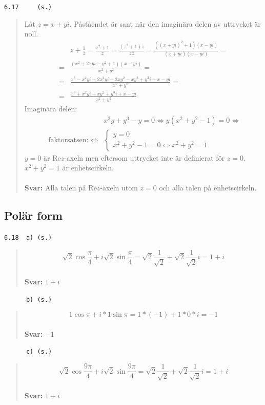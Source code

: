 \documentclass[a4paper]{article}
\newcommand{\tskcol}[1]{\textcolor{tskcol}{#1}}
\begin{document}
	\texttt{\tskcol{6.17~~~~ (s.)}}
	\begin{quotation}
		\noindent
		Låt $z=x+yi$. Påståendet är sant när den imaginära delen av uttrycket är noll.
		\begin{align*}
		&z+\frac{1}{z}=
		\frac{z^2+1}{z}=
		\frac{(z^2+1)\overline{z}}{z\overline{z}}=
		\frac{((x+yi)^2+1)(x-yi)}{(x+yi)(x-yi)}= \\ =
		&\frac{(x^2+2xyi-y^2+1)(x-yi)}{x^2+y^2}= \\ =
		&\frac{x^3-x^2yi+2x^2yi+2xy^2-xy^2+y^3i+x-yi}{x^2+y^2}= \\ =
		&\frac{x^3+x^2yi+xy^2+y^3i+x-yi}{x^2+y^2}
		\end{align*}
		Imaginära delen:
		\begin{align*}
		&x^2y+y^3-y=0 \Leftrightarrow
		y(x^2+y^2-1)=0 \Leftrightarrow \\ \text{ faktorsatsen: } \Leftrightarrow
		&\begin{cases}
		y=0\\
		x^2+y^2-1=0 \Leftrightarrow x^2+y^2=1
		\end{cases}
		\end{align*}
		$y=0$ är Re$z$-axeln men eftersom uttrycket inte är definierat för $z=0$.
		$x^2+y^2=1$ är enhetscirkeln.
		\\ \\
		\textbf{Svar:} Alla talen på Re$z$-axeln utom $z=0$ och alla talen på enhetscirkeln.
	\end{quotation}
	
	\subsection*{Polär form}
	
	\texttt{\tskcol{6.18~~a) (s.)}}
	\begin{quotation}
		\noindent
		\[\sqrt{2}\cos\frac{\pi}{4}+i\sqrt{2}\sin\frac{\pi}{4}=
		\sqrt{2}\frac{1}{\sqrt{2}}+\sqrt{2}\frac{1}{\sqrt{2}}i=
		1+i\]
		\\
		\textbf{Svar:} $1+i$
	\end{quotation}
	
	\texttt{\tskcol{~~~~~~b) (s.)}}
	\begin{quotation}
		\noindent
		\[1\cos\pi+i*1\sin\pi=
		1*(-1)+1*0*i=
		-1\]
		\\
		\textbf{Svar:} $-1$
	\end{quotation}
	
	\texttt{\tskcol{~~~~~~c) (s.)}}
	\begin{quotation}
		\noindent
		\[\sqrt{2}\cos\frac{9\pi}{4}+i\sqrt{2}\sin\frac{9\pi}{4}=
		\sqrt{2}\frac{1}{\sqrt{2}}+\sqrt{2}\frac{1}{\sqrt{2}}i=
		1+i\]
		\\
		\textbf{Svar:} $1+i$
	\end{quotation}
	
\end{document}
